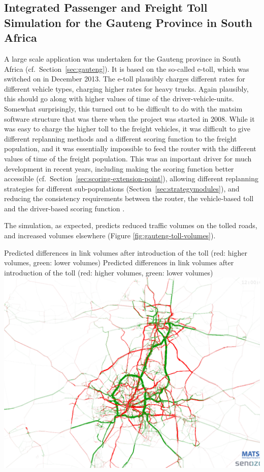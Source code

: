 \subsection{Integrated Passenger and Freight Toll Simulation for the Gauteng Province in South Africa}
A large scale application was undertaken for the Gauteng province in South Africa (cf.\ Section~\ref{sec:gauteng}). It is based on the so-called e-toll, which was switched on in December 2013. The e-toll plausibly charges different rates for different vehicle types, charging higher rates for heavy trucks. Again plausibly, this should go along with higher values of time of the driver-vehicle-units.  Somewhat surprisingly, this turned out to be difficult to do with the \gls{matsim} software structure that was there when the project was started in 2008. While it was easy to charge the higher toll to the freight vehicles, it was difficult to give different replanning methods and a different scoring function to the freight population, and it was essentially impossible to feed the router with the different values of time of the freight population. This was an important driver for much development in recent years, including making the scoring function better accessible (cf.\ Section~\ref{sec:scoring-extension-point}), allowing different replanning strategies for different sub-populations (Section~\ref{sec:strategymodules}), 
 and reducing the consistency requirements between the router, the vehicle-based toll and the driver-based scoring function \citep{NagelKickhoeferJoubert2014HeterogeneousVoTsPROCEDIA}.

The simulation, as expected, predicts reduced traffic volumes on the tolled roads, and increased volumes elsewhere (Figure \ref{fig:gauteng-toll-volumes}).

\createfigure%
{ Predicted differences in link volumes after introduction of the toll (red: higher volumes, green: lower volumes)}%
{ Predicted differences in link volumes after introduction of the toll (red: higher volumes, green: lower volumes)}%
{\label{fig:gauteng-toll-volumes}}%
{\includegraphics[width=0.8\hsize,trim=0 0 0 0,clip]{extending/figures/roadpricing/abs-diff-link-vol-vot55-24h.png}}%
{}

